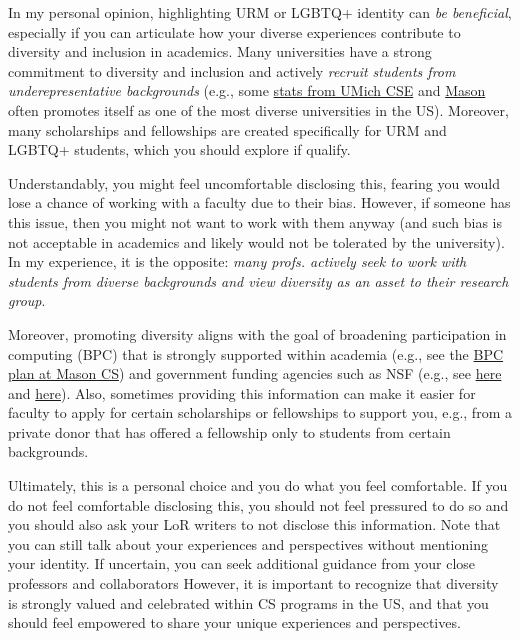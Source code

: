 \documentclass[oneside,11pt,dvipsnames]{book}
\begin{document}
In my personal opinion, highlighting URM or LGBTQ+ identity can \emph{be beneficial}, especially if you can articulate how your diverse experiences contribute to diversity and inclusion in academics.  Many universities have a strong commitment to diversity and inclusion and actively
\emph{recruit students from underepresentative backgrounds} (e.g., some \href{https://cse-climate.engin.umich.edu/reports/climate-dei-reports/cse-climate-and-dei-report-2022-2023/#grad-ethnicity}{stats from UMich CSE} and \href{https://www.Mason.edu/news/2022-09/mason-now-top-10-public-university-diversity-innovation-and-cybersecurity-education-us}{Mason} often promotes itself as one of the most diverse universities in the US). Moreover, many scholarships and fellowships are created specifically for URM and LGBTQ+ students, which you should explore if qualify.

Understandably, you might feel uncomfortable disclosing this, fearing you would lose a chance of working with a faculty due to their bias.  However, if someone has this issue, then you might not want to work with them anyway (and such bias is not acceptable in academics and likely would not be tolerated by the university). In my experience, it is the opposite: \emph{many profs. actively seek to work with students from diverse backgrounds and view diversity as an asset to their research group}.

Moreover, promoting diversity aligns with the goal of broadening participation in computing (BPC) that is strongly supported within academia (e.g., see the \href{https://plans.bpcnet.org/GeorgeMasonUniversity_ComputerScience_DepartmentalBPCPlan.pdf}{BPC plan at Mason CS}) and government funding agencies such as NSF (e.g., see \href{https://new.nsf.gov/cise/broadening-participation}{here} and \href{https://www.nsf.gov/pubs/2022/nsf22125/nsf22125.jsp}{here}).
Also, sometimes providing this information can make it easier for faculty to apply for certain scholarships or fellowships to support you, e.g., from a private donor that has offered a fellowship only to students from certain backgrounds.

Ultimately, this is a personal choice and you do what you feel comfortable.
If you do not feel comfortable disclosing this, you should not feel pressured to do so and you should also ask your LoR writers to not disclose this information.
Note that you can still talk about your experiences and perspectives without mentioning your identity.
If uncertain, you can seek additional guidance from your close professors and collaborators However, it is important to recognize that diversity is strongly valued and celebrated within CS programs in the US, and that you should feel empowered to share your unique experiences and perspectives.
\end{document}
